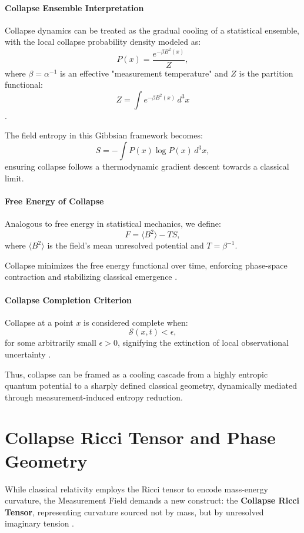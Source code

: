 \paragraph{Collapse Ensemble Interpretation}
Collapse dynamics can be treated as the gradual cooling of a statistical ensemble, with the local collapse probability density modeled as:
\[
P(x) = \frac{e^{-\beta B^2(x)}}{Z},
\]
where $\beta = \alpha^{-1}$ is an effective "measurement temperature" and $Z$ is the partition functional:
\[
Z = \int e^{-\beta B^2(x)} \, d^3x 
\]
\cite{bilardello_diffusion_2016}. 


The field entropy in this Gibbsian framework becomes:
\[
S = -\int P(x) \log P(x) \, d^3x,
\]
ensuring collapse follows a thermodynamic gradient descent towards a classical limit.

\paragraph{Free Energy of Collapse}
Analogous to free energy in statistical mechanics, we define:
\[
F = \langle B^2 \rangle - T S,
\]
where $\langle B^2 \rangle$ is the field's mean unresolved potential and $T = \beta^{-1}$.

Collapse minimizes the free energy functional over time, enforcing phase-space contraction and stabilizing classical emergence \cite{gisin_epistemology_2014, stanford_qm_collapse}.

\paragraph{Collapse Completion Criterion}
Collapse at a point $x$ is considered complete when:
\[
\mathcal{S}(x, t) < \epsilon,
\]
for some arbitrarily small $\epsilon > 0$, signifying the extinction of local observational uncertainty \cite{diosi_penrose_model, bassi_models_2013}.

Thus, collapse can be framed as a cooling cascade from a highly entropic quantum potential to a sharply defined classical geometry, dynamically mediated through measurement-induced entropy reduction.

\section{Collapse Ricci Tensor and Phase Geometry}

While classical relativity employs the Ricci tensor to encode mass-energy curvature, the Measurement Field demands a new construct: the \textbf{Collapse Ricci Tensor}, representing curvature sourced not by mass, but by unresolved imaginary tension \cite{penrose_gravity_1996, born1926quantum, bohm1951quantum}.


